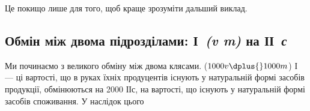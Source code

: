 Це покищо лише для того, щоб краще зрозуміти дальший виклад.
\label{original-305-1}

\subsection[Обмін між двома підрозділами]{Обмін
між двома підрозділами: І~\emph{(v \dplus{} m)} на ІІ~\emph{с}\footnotemark{}}

\label{original-305-2}
Ми%
починаємо з великого обміну між двома клясами. ($1000v \dplus{}
1000m$) І — ці вартості, що в руках їхніх продуцентів існують у натуральній
формі засобів продукції, обмінюються на 2000 ІІс, на вартості,
що існують у натуральній формі засобів споживання. У наслідок цього
\parbreak{}  %
